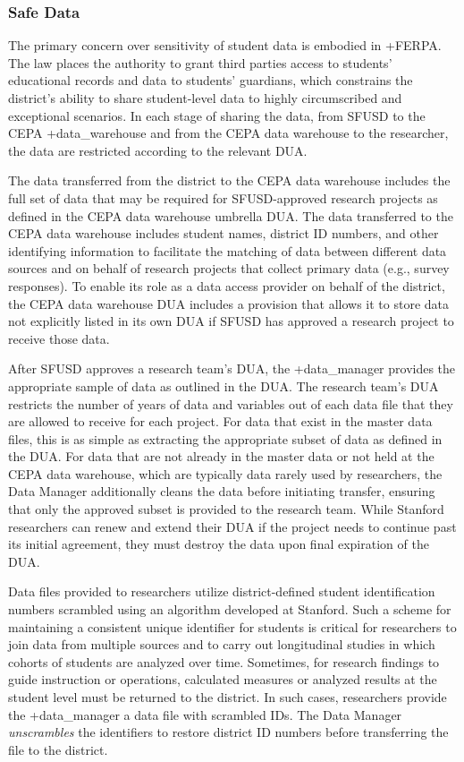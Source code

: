 \documentclass[
]{WileySix}
\begin{document}
\hypertarget{safe-data-5}{%
\subsubsection{Safe Data}\label{safe-data-5}}

The primary concern over sensitivity of student data is embodied in +FERPA\textbar. The law places the authority to grant third parties access to students' educational records and data to students' guardians, which constrains the district's ability to share student-level data to highly circumscribed and exceptional scenarios. In each stage of sharing the data, from SFUSD to the CEPA +data\_warehouse\textbar{} and from the CEPA data warehouse to the researcher, the data are restricted according to the relevant DUA.

The data transferred from the district to the CEPA data warehouse includes the full set of data that may be required for SFUSD-approved research projects as defined in the CEPA data warehouse umbrella DUA. The data transferred to the CEPA data warehouse includes student names, district ID numbers, and other identifying information to facilitate the matching of data between different data sources and on behalf of research projects that collect primary data (e.g., survey responses). To enable its role as a data access provider on behalf of the district, the CEPA data warehouse DUA includes a provision that allows it to store data not explicitly listed in its own DUA if SFUSD has approved a research project to receive those data.

After SFUSD approves a research team's DUA, the +data\_manager\textbar{} provides the appropriate sample of data as outlined in the DUA. The research team's DUA restricts the number of years of data and variables out of each data file that they are allowed to receive for each project. For data that exist in the master data files, this is as simple as extracting the appropriate subset of data as defined in the DUA. For data that are not already in the master data or not held at the CEPA data warehouse, which are typically data rarely used by researchers, the Data Manager additionally cleans the data before initiating transfer, ensuring that only the approved subset is provided to the research team. While Stanford researchers can renew and extend their DUA if the project needs to continue past its initial agreement, they must destroy the data upon final expiration of the DUA.

Data files provided to researchers utilize district-defined student identification numbers scrambled using an algorithm developed at Stanford. Such a scheme for maintaining a consistent unique identifier for students is critical for researchers to join data from multiple sources and to carry out longitudinal studies in which cohorts of students are analyzed over time. Sometimes, for research findings to guide instruction or operations, calculated measures or analyzed results at the student level must be returned to the district. In such cases, researchers provide the +data\_manager\textbar{} a data file with scrambled IDs. The Data Manager \emph{unscrambles} the identifiers to restore district ID numbers before transferring the file to the district.
\end{document}
